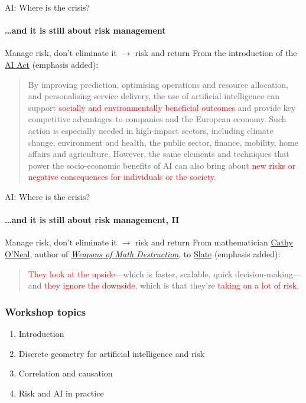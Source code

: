 \begin{frame}{AI: Where is the crisis?}
  \framesubtitle{\ldots and it is still about risk management}
  {\large Manage risk, don't eliminate it $\rightarrow$ risk and return}
  \newline
  \newline
  From the introduction of the \href{https://eur-lex.europa.eu/resource.html?uri=cellar:e0649735-a372-11eb-9585-01aa75ed71a1.0001.02/DOC_1&format=PDF}{AI Act} (emphasis added):
  \begin{quotation}
    By improving prediction, optimising operations and resource allocation, and personalising service delivery, the use of artificial intelligence can support \textcolor{red}{socially and environmentally beneficial outcomes} and provide key competitive advantages to companies and the European economy. Such action is especially needed in high-impact sectors, including climate change, environment and health, the public sector, finance, mobility, home affairs and agriculture. However, the same elements and techniques that power the socio-economic benefits of AI can also bring about \textcolor{red}{new risks or negative consequences for individuals or the society}.
  \end{quotation}

\end{frame}

\begin{frame}{AI: Where is the crisis?}
  \framesubtitle{\ldots and it is still about risk management, II}
  {\large Manage risk, don't eliminate it $\rightarrow$ risk and return}
  \newline
  \newline
  From mathematician \href{https://mathbabe.org/}{Cathy O'Neal}, author of \href{https://en.wikipedia.org/wiki/Weapons_of_Math_Destruction}{\textit{Weapons of Math Destruction}}, to \href{https://slate.com/business/2019/11/apple-card-credit-algorithm-bias-discrimination-women.html}{Slate} (emphasis added):
  \begin{quotation}
    \textcolor{red}{They look at the upside}—which is faster, scalable, quick decision-making—and \textcolor{red}{they ignore the downside}, which is that they're \textcolor{red}{taking on a lot of risk}.
  \end{quotation}

\end{frame}


\begin{frame}
\frametitle{Workshop topics}
\begin{enumerate}
\item Introduction
\item Discrete geometry for artificial intelligence and risk
\item Correlation and causation
\item Risk and AI in practice
\end{enumerate}
\end{frame}

